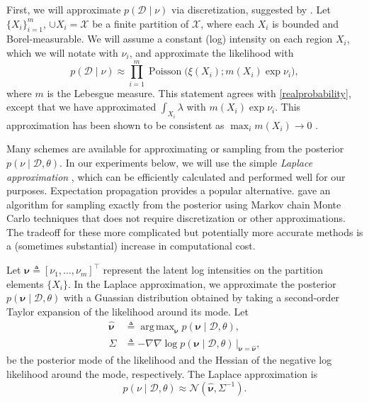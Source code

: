 \documentclass{article}
\newcommand{\deq}{\triangleq}
\newcommand{\cm}[1]{\mathcal{#1}}
\newcommand{\data}{\cm{D}}
\newcommand{\given}{\mid}
\DeclareMathOperator{\poisson}{Poisson}
\DeclareMathOperator*{\argmax}{arg\,max}
\begin{document}
First, we will approximate $p(\data \given \nu)$ via discretization,
suggested by \citet{moller}.  Let $\lbrace X_i \rbrace_{i=1}^m$, $\cup
X_i = \cm{X}$ be a finite partition of $\cm{X}$, where each $X_i$ is
bounded and Borel-measurable. We will assume a constant (log)
intensity on each region $X_i$, which we will notate with $\nu_i$, and
approximate the likelihood with
\begin{equation*}
  p(\data \given \nu) 
  \approx
  \prod_{i=1}^m
  \poisson\bigl(\xi(X_i); m(X_i) \exp \nu_i\bigr),
\end{equation*}
where $m$ is the Lebesgue measure.  This statement agrees with
\eqref{realprobability}, except that we have approximated $\int_{X_i}
\lambda$ with $m(X_i) \exp \nu_i$.  This approximation has been shown
to be consistent as $\max_i m(X_i) \to 0$ \citep{ghosh}.

Many schemes are available for approximating or sampling from the
posterior $p(\nu \given \data, \theta)$.  In our experiments below, we
will use the simple \emph{Laplace approximation}
\citep{williamsbarber}, which can be efficiently calculated and
performed well for our purposes.  Expectation propagation
\citep{minka} provides a popular alternative.  \citet{adams} gave an
algorithm for sampling exactly from the posterior using Markov chain
Monte Carlo techniques that does not require discretization or other
approximations.  The tradeoff for these more complicated but
potentially more accurate methods is a (sometimes substantial)
increase in computational cost.

Let $\bm{\nu} \deq [\nu_1, \dotsc, \nu_m]^\top$ represent the latent
log intensities on the partition elements $\lbrace X_i \rbrace$.  In
the Laplace approximation, we approximate the posterior $p(\bm{\nu}
\given \data, \theta)$ with a Guassian distribution obtained by taking
a second-order Taylor expansion of the likelihood around its mode.
Let
\begin{align*}
  \hat{\bm{\nu}}
  &\deq 
  \argmax_{\bm{\nu}} p(\bm{\nu} \given \data, \theta), \\
  \Sigma 
  &\deq 
  -\nabla\nabla \log p(\bm{\nu} \given \data, \theta)
  \,
  \Bigr\rvert_{\bm{\nu} = \hat{\bm{\nu}}},
\end{align*}
be the posterior mode of the likelihood and the Hessian of the
negative log likelihood around the mode, respectively.  The Laplace
approximation is 
\begin{equation*}
  p(\nu \given \data, \theta) 
  \approx
  \cm{N}(\hat{\bm{\nu}}, \Sigma^{-1}).
\end{equation*}
\end{document}
